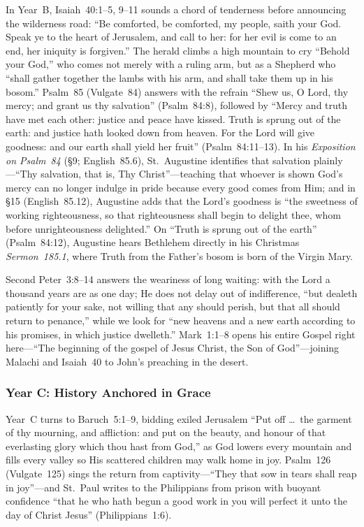 In Year~B, Isaiah~40:1--5, 9--11 sounds a chord of tenderness before announcing the wilderness road: ``Be comforted, be comforted, my people, saith your God. Speak ye to the heart of Jerusalem, and call to her: for her evil is come to an end, her iniquity is forgiven.'' The herald climbs a high mountain to cry ``Behold your God,'' who comes not merely with a ruling arm, but as a Shepherd who ``shall gather together the lambs with his arm, and shall take them up in his bosom.'' Psalm~85 (Vulgate~84) answers with the refrain ``Shew us, O Lord, thy mercy; and grant us thy salvation'' (Psalm~84:8), followed by ``Mercy and truth have met each other: justice and peace have kissed. Truth is sprung out of the earth: and justice hath looked down from heaven. For the Lord will give goodness: and our earth shall yield her fruit'' (Psalm~84:11--13). In his \textit{Exposition on Psalm~84} (\S9; English~85.6), St.~Augustine identifies that salvation plainly---``Thy salvation, that is, Thy Christ''---teaching that whoever is shown God's mercy can no longer indulge in pride because every good comes from Him; and in \S15 (English~85.12), Augustine adds that the Lord's goodness is ``the sweetness of working righteousness, so that righteousness shall begin to delight thee, whom before unrighteousness delighted.'' On ``Truth is sprung out of the earth'' (Psalm~84:12), Augustine hears Bethlehem directly in his Christmas \textit{Sermon~185.1}, where Truth from the Father's bosom is born of the Virgin Mary.

Second Peter~3:8--14 answers the weariness of long waiting: with the Lord a thousand years are as one day; He does not delay out of indifference, ``but dealeth patiently for your sake, not willing that any should perish, but that all should return to penance,'' while we look for ``new heavens and a new earth according to his promises, in which justice dwelleth.'' Mark~1:1--8 opens his entire Gospel right here---``The beginning of the gospel of Jesus Christ, the Son of God''---joining Malachi and Isaiah~40 to John's preaching in the desert.

\subsubsection{Year C: History Anchored in Grace}

Year~C turns to Baruch~5:1--9, bidding exiled Jerusalem ``Put off \dots\ the garment of thy mourning, and affliction: and put on the beauty, and honour of that everlasting glory which thou hast from God,'' as God lowers every mountain and fills every valley so His scattered children may walk home in joy. Psalm~126 (Vulgate~125) sings the return from captivity---``They that sow in tears shall reap in joy''---and St.~Paul writes to the Philippians from prison with buoyant confidence ``that he who hath begun a good work in you will perfect it unto the day of Christ Jesus'' (Philippians~1:6).

